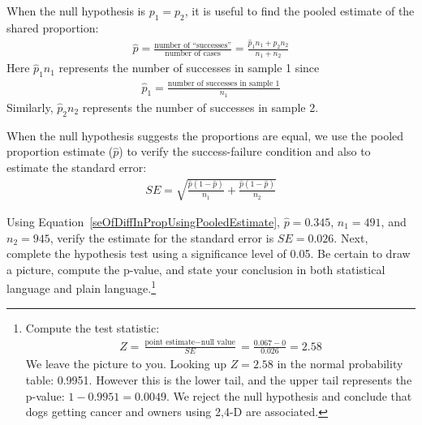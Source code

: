 \begin{termBox}{
When the null hypothesis is $p_1 = p_2$, it is useful to find the pooled estimate of the shared proportion:
\begin{eqnarray*}
\hat{p} = \frac{\text{number of ``successes''}}{\text{number of cases}} = \frac{\hat{p}_1n_1 + \hat{p}_2n_2}{n_1 + n_2}
\end{eqnarray*}
Here $\hat{p}_1n_1$ represents the number of successes in sample 1 since
\begin{eqnarray*}
\hat{p}_1 = \frac{\text{number of successes in sample 1}}{n_1}
\end{eqnarray*}
Similarly, $\hat{p}_2n_2$ represents the number of successes in sample 2.}
\end{termBox}

\begin{tipBox}{
When the null hypothesis suggests the proportions are equal, we use the pooled proportion estimate ($\hat{p}$) to verify the success-failure condition and also to estimate the standard error:
\begin{eqnarray}
SE = \sqrt{\frac{\hat{p}(1-\hat{p})}{n_1} + \frac{\hat{p}(1-\hat{p})}{n_2}} 
\label{seOfDiffInPropUsingPooledEstimate}
\end{eqnarray}}
\end{tipBox}

\begin{exercise}\label{verifySEOfPooledEstimateOf24DWithCancerNoCancerDogs}
Using Equation~\eqref{seOfDiffInPropUsingPooledEstimate}, $\hat{p}=0.345$, $n_1 = 491$, and $n_2=945$, verify the estimate for the standard error is $SE = 0.026$. Next, complete the hypothesis test using a significance level of 0.05. Be certain to draw a picture, compute the p-value, and state your conclusion in both statistical language and plain language.\footnote{Compute the test statistic:
\begin{eqnarray*}
Z = \frac{\text{point estimate} - \text{null value}}{SE} = \frac{0.067 - 0}{0.026} = 2.58
\end{eqnarray*}
We leave the picture to you. Looking up $Z=2.58$ in the normal probability table: 0.9951. However this is the lower tail, and the upper tail represents the p-value: $1-0.9951 = 0.0049$. We reject the null hypothesis and conclude that dogs getting cancer and owners using 2,4-D are associated.}
\end{exercise}


